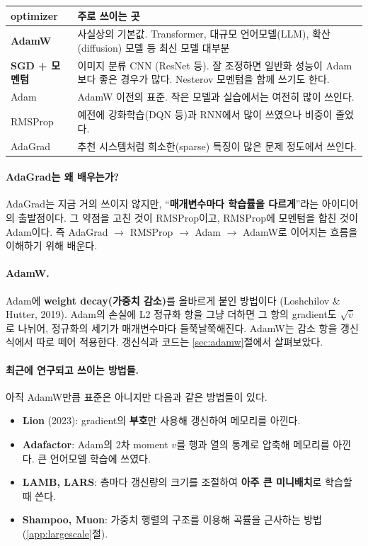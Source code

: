 \documentclass[11pt,a4paper]{article}
\begin{document}
\begin{center}
\begin{tabular}{@{}lp{}@{}}
\toprule
optimizer & 주로 쓰이는 곳 \\
\midrule
\textbf{AdamW} & 사실상의 기본값. Transformer, 대규모 언어모델(LLM), 확산(diffusion) 모델 등 최신 모델 대부분 \\[3pt]
\textbf{SGD + 모멘텀} & 이미지 분류 CNN (ResNet 등). 잘 조정하면 일반화 성능이 Adam보다 좋은 경우가 많다.
Nesterov 모멘텀을 함께 쓰기도 한다. \\[3pt]
Adam & AdamW 이전의 표준. 작은 모델과 실습에서는 여전히 많이 쓰인다. \\[3pt]
RMSProp & 예전에 강화학습(DQN 등)과 RNN에서 많이 쓰였으나 비중이 줄었다. \\[3pt]
AdaGrad & 추천 시스템처럼 희소한(sparse) 특징이 많은 문제 정도에서 쓰인다. \\
\bottomrule
\end{tabular}
\end{center}

\paragraph{AdaGrad는 왜 배우는가?}
AdaGrad는 지금 거의 쓰이지 않지만, ``\textbf{매개변수마다 학습률을 다르게}''라는 아이디어의 출발점이다.
그 약점을 고친 것이 RMSProp이고, RMSProp에 모멘텀을 합친 것이 Adam이다.
즉 AdaGrad $\rightarrow$ RMSProp $\rightarrow$ Adam $\rightarrow$ AdamW로 이어지는 흐름을 이해하기 위해 배운다.

\paragraph{AdamW.}
Adam에 \textbf{weight decay(가중치 감소)}를 올바르게 붙인 방법이다 (Loshchilov \& Hutter, 2019).
Adam의 손실에 L2 정규화 항을 그냥 더하면 그 항의 gradient도 $\sqrt{\hat v}$로 나뉘어,
정규화의 세기가 매개변수마다 들쭉날쭉해진다.
AdamW는 감소 항을 갱신식에서 따로 떼어 적용한다.
갱신식과 코드는 \ref{sec:adamw}절에서 살펴보았다.

\paragraph{최근에 연구되고 쓰이는 방법들.}
아직 AdamW만큼 표준은 아니지만 다음과 같은 방법들이 있다.
\begin{itemize}[leftmargin=1.8em]
\item \textbf{Lion} (2023): gradient의 \textbf{부호}만 사용해 갱신하여 메모리를 아낀다.
\item \textbf{Adafactor}: Adam의 2차 moment $v$를 행과 열의 통계로 압축해 메모리를 아낀다. 큰 언어모델 학습에 쓰였다.
\item \textbf{LAMB, LARS}: 층마다 갱신량의 크기를 조절하여 \textbf{아주 큰 미니배치}로 학습할 때 쓴다.
\item \textbf{Shampoo, Muon}: 가중치 행렬의 구조를 이용해 곡률을 근사하는 방법 (\ref{app:largescale}절).
\end{itemize}
\end{document}
